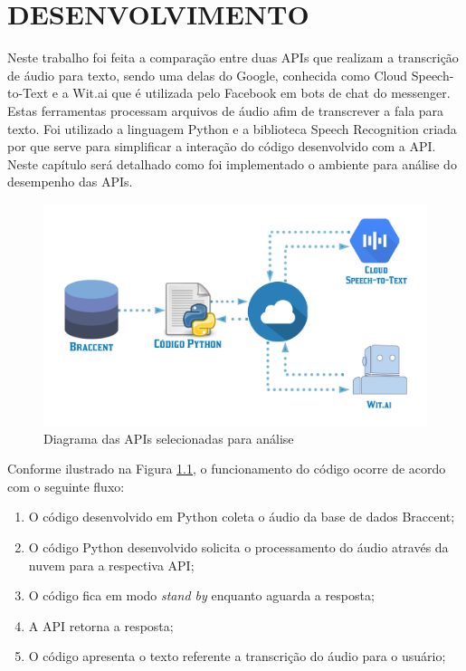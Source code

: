 \chapter[DESENVOLVIMENTO]{DESENVOLVIMENTO}


Neste trabalho foi feita a comparação entre duas APIs que realizam a transcrição de áudio para texto, sendo uma delas do Google, conhecida como Cloud Speech-to-Text e a Wit.ai que é utilizada pelo Facebook em bots de chat do messenger. Estas ferramentas processam arquivos de áudio afim de transcrever a fala para texto. Foi utilizado a linguagem Python e a biblioteca Speech Recognition criada por  que serve para simplificar a interação do código desenvolvido com a API. Neste capítulo será detalhado como foi implementado o ambiente para análise do desempenho das APIs.

\begin{figure}[h!]
\centering
\caption{Diagrama das APIs selecionadas para análise}
\label{diagramaAPI}
\includegraphics[width=115mm]{images/Diagramas/APIs.png}
\end{figure}

Conforme ilustrado na Figura \ref{diagramaAPI}, o funcionamento do código ocorre de acordo com o seguinte fluxo:

\begin{enumerate}[itemsep=2pt,parsep=2pt]
    \item O código desenvolvido em Python coleta o áudio da base de dados Braccent;
    \item O código Python desenvolvido solicita o processamento do áudio através da nuvem para a respectiva API;
    \item O código fica em modo \emph{stand by} enquanto aguarda a resposta;
    \item A API retorna a resposta;
    \item O código apresenta o texto referente a transcrição do áudio para o usuário;
\end{enumerate}

